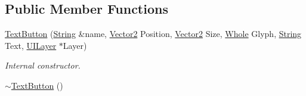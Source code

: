 \subsection*{Public Member Functions}
\begin{DoxyCompactItemize}
\item 
\hyperlink{classphys_1_1UI_1_1TextButton_a21f4d17b01e51840cedb6c73d5668188}{TextButton} (\hyperlink{namespacephys_aa03900411993de7fbfec4789bc1d392e}{String} \&name, \hyperlink{classphys_1_1Vector2}{Vector2} Position, \hyperlink{classphys_1_1Vector2}{Vector2} Size, \hyperlink{namespacephys_a460f6bc24c8dd347b05e0366ae34f34a}{Whole} Glyph, \hyperlink{namespacephys_aa03900411993de7fbfec4789bc1d392e}{String} Text, \hyperlink{classphys_1_1UILayer}{UILayer} $\ast$Layer)
\begin{DoxyCompactList}\small\item\em Internal constructor. \item\end{DoxyCompactList}\item 
\hypertarget{classphys_1_1UI_1_1TextButton_a1f28489fee45ee8ce7e1b0aea0f249a1}{
\hyperlink{classphys_1_1UI_1_1TextButton_a1f28489fee45ee8ce7e1b0aea0f249a1}{$\sim$TextButton} ()}
\label{df/d03/classphys_1_1UI_1_1TextButton_a1f28489fee45ee8ce7e1b0aea0f249a1}


\end{DoxyCompactItemize}
